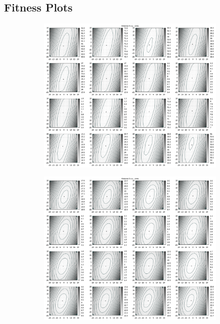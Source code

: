 \begin{appendix}
\chapter{Fitness Plots}
\label{app:fitness:plots1}
\newpage
\begin{figure}[!ht]
	\centering
	\begin{subfigure}[t]{0.3\textwidth}
	     \centering
	     \includegraphics[width=\textwidth]{img/fitness/xy/a0.png}
	\end{subfigure}
	\begin{subfigure}[t]{0.3\textwidth}
		\centering
	     \includegraphics[width=\textwidth]{img/fitness/xz/a0.png}

\end{subfigure}
\end{figure}
\end{appendix}
